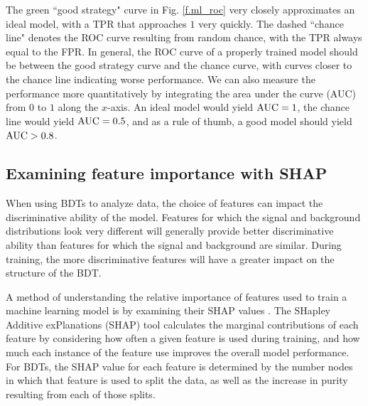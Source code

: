 The green ``good strategy" curve in Fig. \ref{f.ml_roc} very closely approximates an ideal model, with a TPR that approaches $1$ very quickly. The dashed ``chance line" denotes the ROC curve resulting from random chance, with the TPR always equal to the FPR. In general, the ROC curve of a properly trained model should be between the good strategy curve and the chance curve, with curves closer to the chance line indicating worse performance. We can also measure the performance more quantitatively by integrating the area under the curve (AUC) from $0$ to $1$ along the $x$-axis. An ideal model would yield ${\rm AUC}=1$, the chance line would yield ${\rm AUC}=0.5$, and as a rule of thumb, a good model should yield ${\rm AUC}>0.8$. 


\subsection{Examining feature importance with SHAP}
\label{sec.ml_shap}

When using BDTs to analyze data, the choice of features can impact the discriminative ability of the model. Features for which the signal and background distributions look very different will generally provide better discriminative ability than features for which the signal and background are similar. During training, the more discriminative features will have a greater impact on the structure of the BDT.

A method of understanding the relative importance of features used to train a machine learning model is by examining their SHAP values \cite{SHAP}. The SHapley Additive exPlanations (SHAP) tool calculates the marginal contributions of each feature by considering how often a given feature is used during training, and how much each instance of the feature use improves the overall model performance. For BDTs, the SHAP value for each feature is determined by the number nodes in which that feature is used to split the data, as well as the increase in purity resulting from each of those splits.

